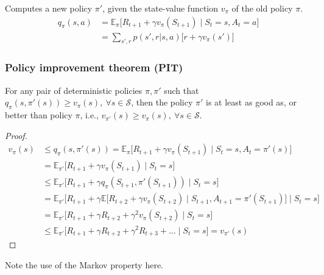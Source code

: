 Computes a new policy \( \pi' \), given the state-value function \( v_\pi \) of the old policy \( \pi \).
\begin{equation}
    \begin{aligned}
        q_\pi(s, a)
         & =
        \mathbb{E}_{\pi} \big[ R_{t+1} + \gamma v_\pi(S_{t+1}) \;\big|\; S_t = s, A_t = a \big]
        \\ & =
        \sum_{s', r} p(s', r | s, a) \Big[ r + \gamma v_\pi(s') \Big]
    \end{aligned}
\end{equation}

\subsubsection{Policy improvement theorem (PIT)}

For any pair of deterministic policies \( \pi, \pi' \) such that \( q_\pi(s, \pi'(s)) \geq v_\pi(s), \ \forall s \in \mathcal{S} \), then the policy \( \pi' \) is at least as good as, or better than policy \( \pi \), i.e., \( v_{\pi'}(s) \geq v_\pi(s), \ \forall s \in \mathcal{S} \).
\begin{proof}
    \begin{equation*}
        \begin{aligned}
            v_{\pi}(s)
             & \leq
            q_{\pi}(s, \pi'(s))
            =
            \mathbb{E}_{\pi} \big[ R_{t+1} + \gamma v_{\pi}(S_{t+1}) \;\big|\; S_t = s, A_t = \pi'(s) \big]
            \\ & =
            \mathbb{E}_{\pi'} \big[ R_{t+1} + \gamma v_{\pi}(S_{t+1}) \;\big|\; S_t = s \big]
            \\ & \leq
            \mathbb{E}_{\pi'} \big[ R_{t+1} + \gamma q_{\pi}(S_{t+1}, \pi'(S_{t+1})) \;\big|\; S_t = s \big]
            \\ & =
            \mathbb{E}_{\pi'} \big[ R_{t+1} + \gamma \mathbb{E} \big[ R_{t+2} + \gamma v_{\pi}(S_{t+2}) \;\big|\; S_{t+1}, A_{t+1} = \pi'(S_{t+1}) \big] \;\big|\; S_t = s \big]
            \\ & =
            \mathbb{E}_{\pi'} \big[ R_{t+1} + \gamma R_{t+2} + \gamma^2 v_{\pi}(S_{t+2}) \;\big|\; S_t = s \big]
            \\ & \leq
            \mathbb{E}_{\pi'} \big[ R_{t+1} + \gamma R_{t+2} + \gamma^2 R_{t+3} + \dots \;\big|\; S_t = s \big]
            = v_{\pi'}(s)
        \end{aligned}
    \end{equation*}
\end{proof}
Note the use of the Markov property here.

